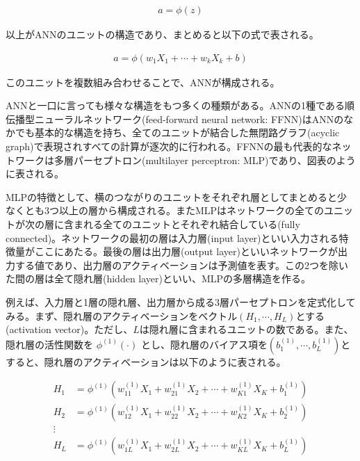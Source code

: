 \documentclass[a4paper, 12pt]{jsreport}
\begin{document}
\begin{equation}
  \begin{split}
    a = \phi(z)
  \end{split}
\end{equation}

以上がANNのユニットの構造であり、まとめると以下の式で表される。

\begin{equation}
  \begin{split}
    a = \phi(w_1 X_1 + \cdots + w_k X_k + b)
  \end{split}
\end{equation}


このユニットを複数組み合わせることで、ANNが構成される。

ANNと一口に言っても様々な構造をもつ多くの種類がある。ANNの1種である順伝播型ニューラルネットワーク(feed-forward neural network: FFNN)はANNのなかでも基本的な構造を持ち、全てのユニットが結合した無閉路グラフ(acyclic graph)で表現されすべての計算が逐次的に行われる。FFNNの最も代表的なネットワークは多層パーセプトロン(multilayer perceptron: MLP)であり、図表のように表される。


MLPの特徴として、横のつながりのユニットをそれぞれ層としてまとめると少なくとも3つ以上の層から構成される。またMLPはネットワークの全てのユニットが次の層に含まれる全てのユニットとそれぞれ結合している(fully connected)。ネットワークの最初の層は入力層(input layer)といい入力される特徴量がここにあたる。最後の層は出力層(output layer)といいネットワークが出力する値であり、出力層のアクティベーションは予測値を表す。この2つを除いた間の層は全て隠れ層(hidden layer)といい、MLPの多層構造を作る。

例えば、入力層と1層の隠れ層、出力層から成る3層パーセプトロンを定式化してみる。まず、隠れ層のアクティベーションをベクトル$(H_1, \cdots, H_L)$とする(activation vector)。ただし、$L$は隠れ層に含まれるユニットの数である。また、隠れ層の活性関数を $\phi^{(1)}(\cdot)$ とし、隠れ層のバイアス項を$(b^{(1)}_1, \cdots, b^{(1)}_L)$とすると、隠れ層のアクティベーションは以下のように表される。

\begin{equation}
  \begin{split}
    H_1 &= \phi^{(1)}(w^{(1)}_{11} X_1 + w^{(1)}_{21} X_2 + \cdots + w^{(1)}_{K1} X_K + b^{(1)}_1) \\
    H_2 &= \phi^{(1)}(w^{(1)}_{12} X_1 + w^{(1)}_{22} X_2 + \cdots + w^{(1)}_{K2} X_K + b^{(1)}_2) \\
    \vdots \\
    H_L &= \phi^{(1)}(w^{(1)}_{1L} X_1 + w^{(1)}_{2L} X_2 + \cdots + w^{(1)}_{KL} X_K + b^{(1)}_L) \\
  \end{split}
\end{equation}
\end{document}
